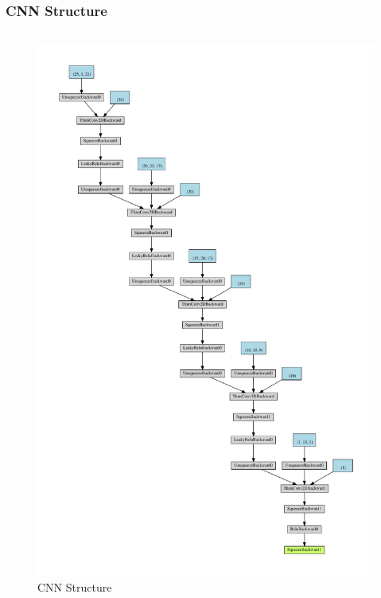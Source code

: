\documentclass{beamer}
\begin{document}
\begin{frame}
\frametitle{CNN Structure}
\begin{columns}
\begin{figure}[H]
    \centering
    \caption{CNN Structure}
    \includegraphics[width=1.0\textwidth]{img/model.pdf}
\end{figure}

\end{columns}
\end{frame}
\end{document}
